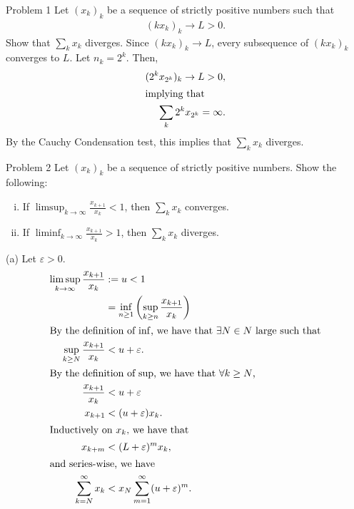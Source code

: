 \documentclass[8pt]{extarticle}
\title{}
\author{Avinash Iyer}
\date{}
\begin{document}
  \begin{problem}{Problem 1}
    Let $(x_k)_k$ be a sequence of strictly positive numbers such that
    \begin{align*}
      (kx_k)_k \rightarrow L > 0.
    \end{align*}
    Show that $\sum_k x_k$ diverges.
    \tcblower
    Since $(kx_k)_k\rightarrow L$, every subsequence of $(kx_k)_k$ converges to $L$. Let $n_k = 2^k$. Then,
    \begin{align*}
      (2^kx_{2^k})_k \rightarrow L > 0,\\
      \shortintertext{implying that}
      \sum_{k}2^kx_{2^k} = \infty.
    \end{align*}
    By the Cauchy Condensation test, this implies that $\sum_k x_k$ diverges.
  \end{problem}
  \begin{problem}{Problem 2}
    Let $(x_k)_k$ be a sequence of strictly positive numbers. Show the following:
    \begin{enumerate}[(i)]
      \item If $\limsup_{k\rightarrow\infty}\frac{x_{k+1}}{x_k} < 1$, then $\sum_{k}x_k$ converges.
      \item If $\liminf_{k\rightarrow\infty}\frac{x_{k+1}}{x_k} > 1$, then $\sum_k x_k$ diverges.
    \end{enumerate}
    \tcblower
    \begin{problem}{(a)}
      Let $\varepsilon > 0$.
      \begin{align*}
        \limsup_{k\rightarrow\infty} \frac{x_{k+1}}{x_k} &:= u < 1\\
                                                         &= \inf_{n\geq 1}\left(\sup_{k\geq n}\frac{x_{k+1}}{x_k}\right)\\
        \shortintertext{By the definition of $\inf$, we have that $\exists N\in N$ large such that}
        \sup_{k\geq N}\frac{x_{k+1}}{x_k} &< u + \varepsilon.\\
        \shortintertext{By the definition of $\sup$, we have that $\forall k \geq N$,}
        \frac{x_{k+1}}{x_k} &< u + \varepsilon\\
        x_{k+1} &< (u + \varepsilon) x_k.\\
        \shortintertext{Inductively on $x_k$, we have that}
        x_{k + m} &< (L + \varepsilon)^{m}x_k,\\
        \shortintertext{and series-wise, we have}
        \sum_{k=N}^{\infty}x_k &< x_N \sum_{m=1}^{\infty}(u + \varepsilon)^m.\\

\end{align*}
\end{problem}
\end{problem}
\end{document}
